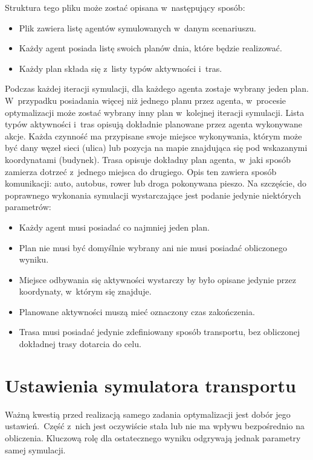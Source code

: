 \documentclass[twoside,12pt]{report}
\begin{document}
Struktura tego pliku może zostać opisana w~następujący sposób:
\begin{itemize}
\item Plik zawiera listę agentów symulowanych w~danym scenariuszu.
\item Każdy agent posiada listę swoich planów dnia, które będzie realizować.
\item Każdy plan składa się z~listy typów aktywności i~tras.
\end{itemize}

Podczas każdej iteracji symulacji, dla każdego agenta zostaje wybrany jeden plan. W~przypadku posiadania więcej niż jednego planu przez agenta, w~procesie optymalizacji może zostać wybrany inny plan w~kolejnej iteracji symulacji. Lista typów aktywności i~tras opisują dokładnie planowane przez agenta wykonywane akcje. Każda czynność ma przypisane swoje miejsce wykonywania, którym może być dany węzeł sieci (ulica) lub pozycja na mapie znajdująca się pod wskazanymi koordynatami (budynek). Trasa opisuje dokładny plan agenta, w~jaki sposób zamierza dotrzeć z~jednego miejsca do drugiego. Opis ten zawiera sposób komunikacji: auto, autobus, rower lub droga pokonywana pieszo. Na szczęście, do poprawnego wykonania symulacji wystarczające jest podanie jedynie niektórych parametrów:

\begin{itemize}
\item Każdy agent musi posiadać co najmniej jeden plan.
\item Plan nie musi być domyślnie wybrany ani nie musi posiadać obliczonego wyniku.
\item Miejsce odbywania się aktywności wystarczy by było opisane jedynie przez koordynaty, w~którym się znajduje.
\item Planowane aktywności muszą mieć oznaczony czas zakończenia.
\item Trasa musi posiadać jedynie zdefiniowany sposób transportu, bez obliczonej dokładnej trasy dotarcia do celu.
\end{itemize}

\section{Ustawienia symulatora transportu}\label{rozdz.ustawienia_symulatora}
Ważną kwestią przed realizacją samego zadania optymalizacji jest dobór jego ustawień.~Część z~nich jest oczywiście stała lub nie ma wpływu bezpośrednio na obliczenia. Kluczową rolę dla ostatecznego wyniku odgrywają jednak parametry samej symulacji.
\end{document}

